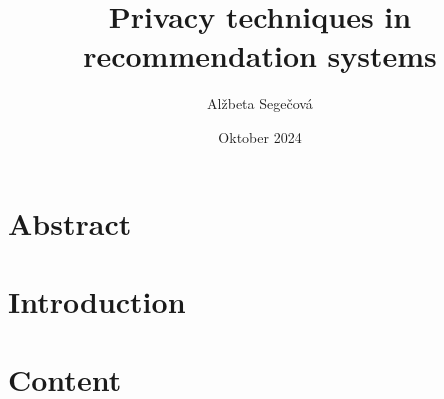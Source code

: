\documentclass[10pt,letterpaper]{article}
\title{Privacy techniques in recommendation systems}
\author{Alžbeta Segečová}
\date{Oktober 2024}
\begin{document}
\maketitle

\section{Abstract}


\section{Introduction}



\section{Content}


\section{}
\end{document}
